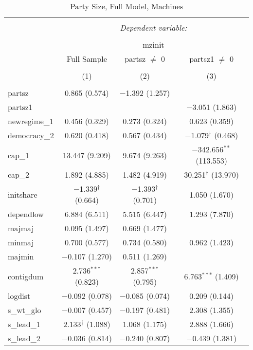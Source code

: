 
\begin{table}[!htbp] \centering 
  \caption{Party Size, Full Model, Machines} 
  \label{} 
\begin{tabular}{@{\extracolsep{5pt}}lccc} 
\\[-1.8ex]\hline 
\hline \\[-1.8ex] 
 & \multicolumn{3}{c}{\textit{Dependent variable:}} \\ 
\cline{2-4} 
\\[-1.8ex] & \multicolumn{3}{c}{mzinit} \\ 
 & Full Sample & partsz $\neq$ 0 & partsz1 $\neq$ 0 \\ 
\\[-1.8ex] & (1) & (2) & (3)\\ 
\hline \\[-1.8ex] 
 partsz & 0.865 (0.574) & $-$1.392 (1.257) &  \\ 
  partsz1 &  &  & $-$3.051 (1.863) \\ 
  newregime\_1 & 0.456 (0.329) & 0.273 (0.324) & 0.623 (0.359) \\ 
  democracy\_2 & 0.620 (0.418) & 0.567 (0.434) & $-$1.079$^{\dagger}$ (0.468) \\ 
  cap\_1 & 13.447 (9.209) & 9.674 (9.263) & $-$342.656$^{**}$ (113.553) \\ 
  cap\_2 & 1.892 (4.885) & 1.482 (4.919) & 30.251$^{\dagger}$ (13.970) \\ 
  initshare & $-$1.339$^{\dagger}$ (0.664) & $-$1.393$^{\dagger}$ (0.701) & 1.050 (1.670) \\ 
  dependlow & 6.884 (6.511) & 5.515 (6.447) & 1.293 (7.870) \\ 
  majmaj & 0.095 (1.497) & 0.669 (1.477) &  \\ 
  minmaj & 0.700 (0.577) & 0.734 (0.580) & 0.962 (1.423) \\ 
  majmin & $-$0.107 (1.270) & 0.511 (1.269) &  \\ 
  contigdum & 2.736$^{***}$ (0.823) & 2.857$^{***}$ (0.795) & 6.763$^{***}$ (1.409) \\ 
  logdist & $-$0.092 (0.078) & $-$0.085 (0.074) & 0.209 (0.144) \\ 
  s\_wt\_glo & $-$0.007 (0.457) & $-$0.197 (0.481) & 2.308 (1.355) \\ 
  s\_lead\_1 & 2.133$^{\dagger}$ (1.088) & 1.068 (1.175) & 2.888 (1.666) \\ 
  s\_lead\_2 & $-$0.036 (0.814) & $-$0.240 (0.807) & $-$0.439 (1.381) \\ 

\end{tabular}
\end{table}
